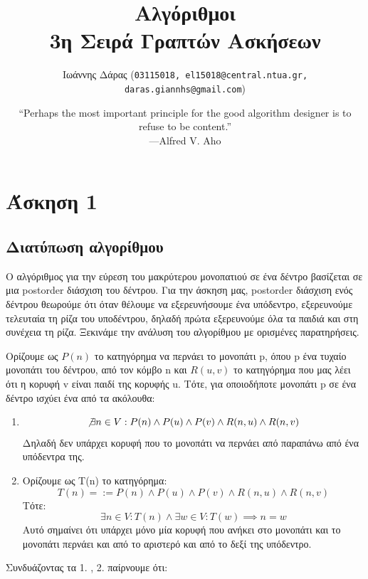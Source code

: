 \documentclass[a4paper,oneside, 11pt]{article}
\title{\textbf{Αλγόριθμοι \\ 3η Σειρά Γραπτών Ασκήσεων}}
\author{ Ιωάννης Δάρας (\texttt{03115018, el15018@central.ntua.gr, daras.giannhs@gmail.com}) \\
}
\date{
“Perhaps the most important principle for the good algorithm designer is to refuse to be content.” \\ —Alfred V. Aho}
\begin{document}
\maketitle
\noindent\makebox[\linewidth]{\rule{\paperwidth}{0.4pt}}

\section{Άσκηση 1}
\subsection{Διατύπωση αλγορίθμου}
Ο αλγόριθμος για την εύρεση του μακρύτερου μονοπατιού σε ένα δέντρο βασίζεται σε μια postorder διάσχιση του δέντρου. Για την άσκηση μας, postorder διάσχιση ενός δέντρου θεωρούμε ότι όταν θέλουμε να εξερευνήσουμε ένα υπόδεντρο, εξερευνούμε τελευταία τη ρίζα του υποδέντρου, δηλαδή πρώτα εξερευνούμε όλα τα παιδιά και στη συνέχεια τη ρίζα. Ξεκινάμε την ανάλυση του αλγορίθμου με ορισμένες παρατηρήσεις.\bigbreak 

Ορίζουμε ως $P(n)$ το κατηγόρημα να περνάει το μονοπάτι p, όπου p ένα τυχαίο μονοπάτι του δέντρου, από τον κόμβο n και $R(u,v)$ το κατηγόρημα που μας λέει ότι η κορυφή v είναι παιδί της κορυφής u. Τότε, για οποιοδήποτε μονοπάτι p σε ένα δέντρο ισχύει ένα από τα ακόλουθα:
\begin{enumerate}
\item 
$$\not \exists n \in V: P(n) \wedge P(u) \wedge P(v) \wedge R(n, u) \wedge R(n, v)$$
Δηλαδή δεν υπάρχει κορυφή που το μονοπάτι να περνάει από παραπάνω από ένα υπόδεντρα της.
\item 
Ορίζουμε ως T(n) το κατηγόρημα:
$$
T(n) =:= P(n) \wedge P(u) \wedge P(v) \wedge R(n, u) \wedge R(n, v)
$$
Τότε:
$$
\exists n \in V: T(n) \wedge \exists w \in V: T(w) \implies n=w
$$
Αυτό σημαίνει ότι υπάρχει μόνο μία κορυφή που ανήκει στο μονοπάτι και το μονοπάτι περνάει και από το αριστερό και από το δεξί της υπόδεντρο.
\end{enumerate}

Συνδυάζοντας τα 1. , 2. παίρνουμε ότι:
\end{document}
